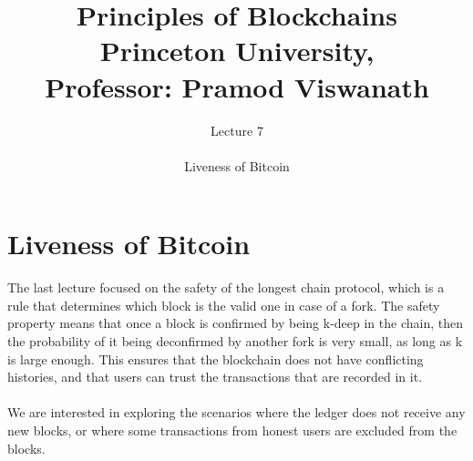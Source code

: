 \documentclass{report}
\title{\Huge{Principles of Blockchains \\ Princeton University,\\
		Professor: Pramod Viswanath}}
\author{\huge{Lecture 7} \\\\ Liveness of Bitcoin}
\begin{document}
\maketitle
\newpage%
\tableofcontents
\pagebreak

\chapter{Liveness of Bitcoin}
The last lecture focused on the safety of the longest chain protocol, which is a rule that determines which block is the valid one in case of a fork. The safety property means that once a block is confirmed by being k-deep in the chain, then the probability of it being deconfirmed by another fork is very small, as long as k is large enough. This ensures that the blockchain does not have conflicting histories, and that users can trust the transactions that are recorded in it.\\\\
We are interested in exploring the scenarios where the ledger does not receive any new blocks, or where some transactions from honest users are excluded from the blocks. 
\end{document}
